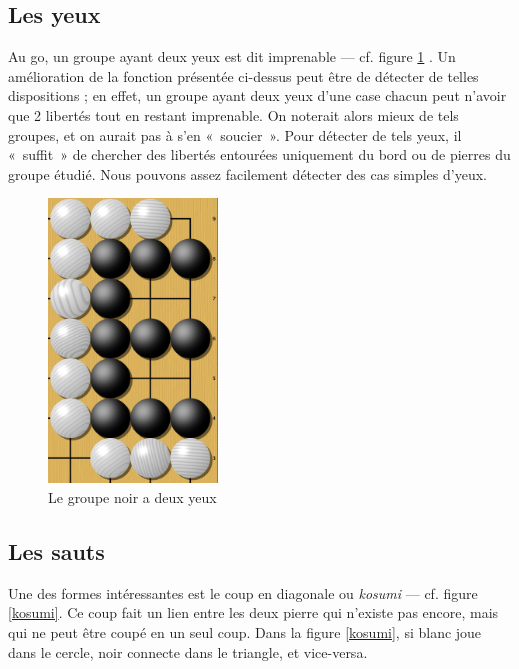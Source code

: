 \documentclass[11pt,a4paper,titlepage,french]{article}
\begin{document}
		\subsection{Les yeux}
			Au go, un groupe ayant deux yeux est dit imprenable --- cf. figure \ref{deuxyeux} . Un amélioration de la fonction présentée ci-dessus peut être de détecter de telles dispositions ; en effet, un groupe ayant deux yeux d'une case chacun peut n'avoir que 2 libertés tout en restant imprenable. On noterait alors mieux de tels groupes, et on aurait pas à s'en «~soucier~». Pour détecter de tels yeux, il «~suffit~» de chercher des libertés entourées uniquement du bord ou de pierres du groupe étudié. Nous pouvons assez facilement détecter des cas simples d'yeux.

			\begin{figure}[hbt]
			\begin{center}
			\includegraphics[width=0.4\textwidth]{deuxyeux.png}
			\end{center}
			\caption{Le groupe noir a deux yeux}
			\label{deuxyeux}
			\end{figure}

		\subsection{Les sauts}

			Une des formes intéressantes est le coup en diagonale ou \emph{kosumi} --- cf. figure \ref{kosumi}. Ce coup fait un lien entre les deux pierre qui n'existe pas encore, mais qui ne peut être coupé en un seul coup. Dans la figure \ref{kosumi}, si blanc joue dans le cercle, noir connecte dans le triangle, et vice-versa.
\end{document}

